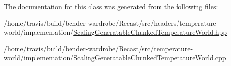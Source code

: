 The documentation for this class was generated from the following files\-:\begin{DoxyCompactItemize}
\item 
/home/travis/build/bender-\/wardrobe/\-Recast/src/headers/temperature-\/world/implementation/\hyperlink{_scaling_generatable_chunked_temperature_world_8hpp}{Scaling\-Generatable\-Chunked\-Temperature\-World.\-hpp}\item 
/home/travis/build/bender-\/wardrobe/\-Recast/src/temperature-\/world/implementation/\hyperlink{_scaling_generatable_chunked_temperature_world_8cpp}{Scaling\-Generatable\-Chunked\-Temperature\-World.\-cpp}\end{DoxyCompactItemize}
